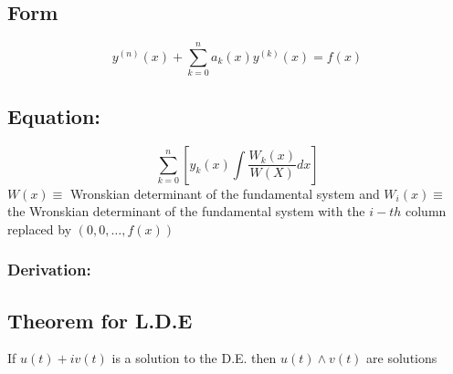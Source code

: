 \documentclass[11pt]{article}
\begin{document}
\subsection{Form}
\label{sec-12.1}

   \begin{equation}
   y^{(n)}(x)+\sum_{k=0}^na_k(x)y^{(k)}(x)=f(x)
   \end{equation}
\subsection{Equation:}
\label{sec-12.2}

   \begin{equation}
   \sum_{k=0}^n[y_k(x)\int{\frac{W_k(x)}{W(X)}dx}]
   \end{equation}
   $W(x)\equiv$ Wronskian determinant of the fundamental system
   and $W_i(x)\equiv$ the Wronskian determinant of the fundamental system
   with the $i-th$ column replaced by $(0,0,\ldots,f(x))$   
\subsubsection{Derivation:}
\label{sec-12.2.1}


\subsection{Theorem for L.D.E}
\label{sec-12.3}

   If $u(t)+iv(t)$ is a solution to the D.E. then $u(t) \wedge v(t)$
   are solutions
\end{document}
